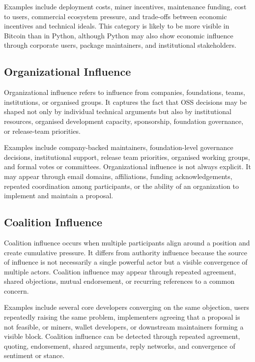 Examples include deployment costs, miner incentives, maintenance funding, cost to users, commercial ecosystem pressure, and trade-offs between economic incentives and technical ideals. This category is likely to be more visible in Bitcoin than in Python, although Python may also show economic influence through corporate users, package maintainers, and institutional stakeholders.

\subsection{Organizational Influence}

Organizational influence refers to influence from companies, foundations, teams, institutions, or organised groups. It captures the fact that OSS decisions may be shaped not only by individual technical arguments but also by institutional resources, organised development capacity, sponsorship, foundation governance, or release-team priorities.

Examples include company-backed maintainers, foundation-level governance decisions, institutional support, release team priorities, organised working groups, and formal votes or committees. Organizational influence is not always explicit. It may appear through email domains, affiliations, funding acknowledgements, repeated coordination among participants, or the ability of an organization to implement and maintain a proposal.

\subsection{Coalition Influence}

Coalition influence occurs when multiple participants align around a position and create cumulative pressure. It differs from authority influence because the source of influence is not necessarily a single powerful actor but a visible convergence of multiple actors. Coalition influence may appear through repeated agreement, shared objections, mutual endorsement, or recurring references to a common concern.

Examples include several core developers converging on the same objection, users repeatedly raising the same problem, implementers agreeing that a proposal is not feasible, or miners, wallet developers, or downstream maintainers forming a visible block. Coalition influence can be detected through repeated agreement, quoting, endorsement, shared arguments, reply networks, and convergence of sentiment or stance.

